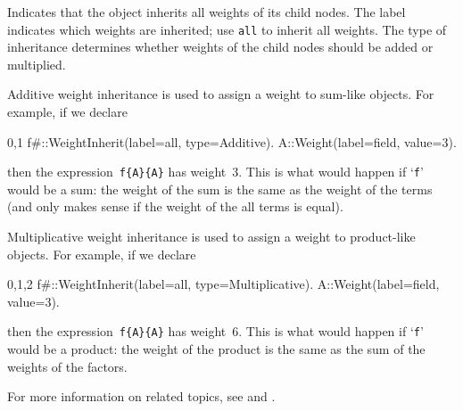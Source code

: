 
Indicates that the object inherits all weights of its child nodes. The
label indicates which weights are inherited; use {\tt all} to inherit
all weights. The type of inheritance determines whether weights of the
child nodes should be added or multiplied. 

Additive weight inheritance is used to assign a weight to sum-like
objects. For example, if we declare
\begin{screen}{0,1}
f{#}::WeightInherit(label=all, type=Additive).
A::Weight(label=field, value=3).
\end{screen}
then the expression~\verb|f{A}{A}| has weight~3. This is what would
happen if `\verb|f|' would be a sum: the weight of the sum is the same
as the weight of the terms (and only makes sense if the weight of the
all terms is equal).

Multiplicative weight inheritance is used to assign a weight to 
product-like objects. For example, if we declare
\begin{screen}{0,1,2}
f{#}::WeightInherit(label=all, type=Multiplicative).
A::Weight(label=field, value=3).
\end{screen}
then the expression~\verb|f{A}{A}| has weight~6. This is what would
happen if `\verb|f|' would be a product: the weight of the product is the same
as the sum of the weights of the factors.

For more information on related topics, see 
and .



